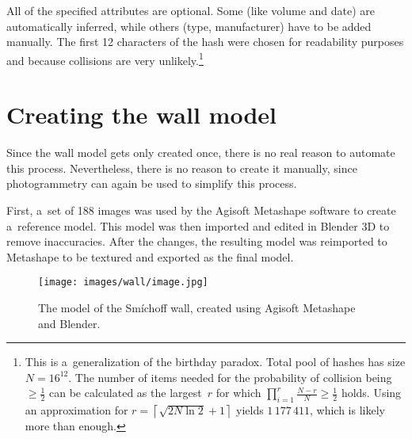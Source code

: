 All of the specified attributes are optional.
Some (like volume and date) are automatically inferred, while others (type, manufacturer) have to be added manually.
The first 12 characters of the hash were chosen for readability purposes and because collisions are very unlikely.\footnote{This is a~generalization of the birthday paradox. Total pool of hashes has size $N = 16^{12}$. The number of items needed for the probability of collision being $\ge \frac{1}{2}$ can be calculated as the largest~$r$ for which $\prod_{i = 1}^{r} \frac{N - r}{N} \ge \frac{1}{2}$ holds. Using an approximation for $r = \left\lceil \sqrt{2N \ln 2} + 1 \right\rceil$ \cite{brink2012probably} yields $1\,177\,411$, which is likely more than enough.}

\section{Creating the wall model}
Since the wall model gets only created once, there is no real reason to automate this process.
Nevertheless, there is no reason to create it manually, since photogrammetry can again be used to simplify this process.

First, a~set of 188 images was used by the Agisoft Metashape software to create a~reference model.
This model was then imported and edited in Blender 3D to remove inaccuracies.
After the changes, the resulting model was reimported to Metashape to be textured and exported as the final model.

\begin{figure}[h]
	\centering
	\texttt{[image: images/wall/image.jpg]}
	\caption{The model of the Smíchoff wall, created using Agisoft Metashape and Blender.}
	\label{fig:model}
\end{figure}
